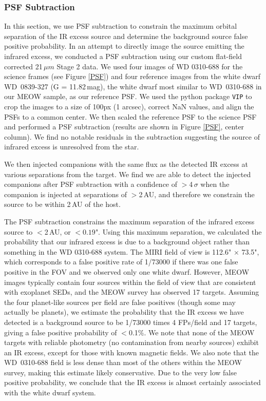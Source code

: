 \documentclass[twocolumn]{aastex631}
\begin{document}
\subsubsection{PSF Subtraction}
In this section, we use PSF subtraction to constrain the maximum orbital separation of the IR excess source and determine the background source false positive probability.
In an attempt to directly image the source emitting the infrared excess, we conducted a PSF subtraction using our custom flat-field corrected 21\,$\mu m$ Stage 2 data.  We used four images of WD 0310-688 for the science frames (see Figure \ref{PSF}) and four reference images from the white dwarf  {WD~0839-327 (G = 11.82\,mag), the white dwarf most similar to WD~0310-688 in our MEOW sample, as our reference PSF. }
We used the python package \texttt{VIP} \citep{VIP} to crop the images to a size of 100px (1 arcsec), correct NaN values, and align the PSFs to a common center. 
We then scaled the reference PSF to the science PSF and performed a PSF subtraction (results are shown in Figure \ref{PSF}, center column). We find no notable residuals in the subtraction suggesting the source of infrared excess is unresolved from the star. 

We then injected companions with the same flux as the detected IR excess at various separations from the target. We find we are able to detect the injected companions after PSF subtraction with a confidence of $>$4\,$\sigma$ when the companion is injected at separations of $>$2\,AU, and therefore we constrain the source to be within 2\,AU of the host.





The PSF subtraction constrains the maximum separation of the infrared excess source to $<$2\,AU, or $<0.19$". Using this maximum separation, we calculated the probability that our infrared excess is due to a background object rather than something in the WD 0310-688 system. The MIRI field of view is 112.6" $\times$ 73.5", which corresponds to a false positive rate of 1/73000 if there was one false positive in the FOV and we observed only one white dwarf. However, MEOW images typically contain four sources within the field of view that are consistent with exoplanet SEDs, and the MEOW survey has observed 17 targets. Assuming the four planet-like sources per field are false positives (though some may actually be planets), we estimate the probability that the IR excess we have detected is a background source to be 1/73000 times 4 FPs/field and 17 targets, giving a false positive probability of $<$0.1\%. {We note that none of the MEOW targets with reliable photometry (no contamination from nearby sources) exhibit an IR excess, except for those with known magnetic fields.} We also note that the WD~0310-688 field is less dense than most of the others within the MEOW survey, making this estimate likely conservative. Due to the very low false positive probability, we conclude that the IR excess is almost certainly associated with the white dwarf system.
\end{document}
